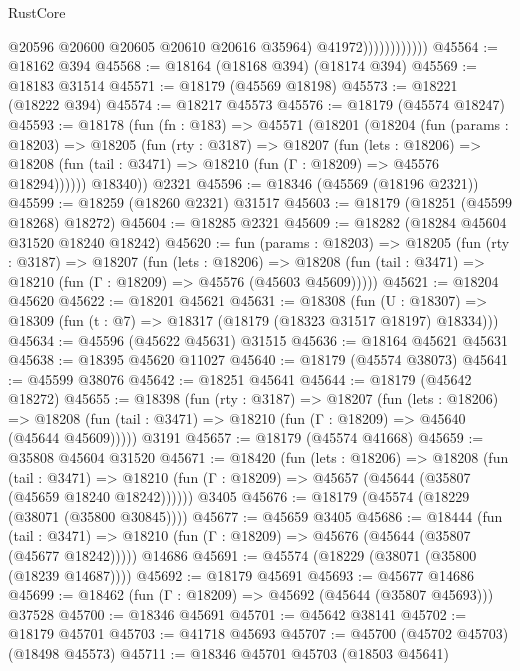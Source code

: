 \begin{lexlean}{RustCore}
\begin{coremodule}
                              @20596
                              @20600
                              @20605
                              @20610
                              @20616
                              @35964)
                            @41972))))))))))))
@45564 := @18162 @394
@45568 := @18164 (@18168 @394) (@18174 @394)
@45569 := @18183 @31514
@45571 := @18179 (@45569 @18198)
@45573 := @18221 (@18222 @394)
@45574 := @18217 @45573
@45576 := @18179 (@45574 @18247)
@45593 := @18178
    (fun (fn : @183) =>
    @45571
      (@18201
        (@18204
          (fun (params : @18203) =>
          @18205
            (fun (rty : @3187) =>
            @18207
              (fun (lets : @18206) =>
              @18208 (fun (tail : @3471) => @18210 (fun (Γ : @18209) => @45576 @18294))))))
        @18340))
    @2321
@45596 := @18346 (@45569 (@18196 @2321))
@45599 := @18259 (@18260 @2321) @31517
@45603 := @18179 (@18251 (@45599 @18268) @18272)
@45604 := @18285 @2321
@45609 := @18282 (@18284 @45604 @31520 @18240 @18242)
@45620 := fun (params : @18203) =>
  @18205
    (fun (rty : @3187) =>
    @18207
      (fun (lets : @18206) =>
      @18208 (fun (tail : @3471) => @18210 (fun (Γ : @18209) => @45576 (@45603 @45609)))))
@45621 := @18204 @45620
@45622 := @18201 @45621
@45631 := @18308
    (fun (U : @18307) => @18309 (fun (t : @7) => @18317 (@18179 (@18323 @31517 @18197) @18334)))
@45634 := @45596 (@45622 @45631) @31515
@45636 := @18164 @45621 @45631
@45638 := @18395 @45620 @11027
@45640 := @18179 (@45574 @38073)
@45641 := @45599 @38076
@45642 := @18251 @45641
@45644 := @18179 (@45642 @18272)
@45655 := @18398
    (fun (rty : @3187) =>
    @18207
      (fun (lets : @18206) =>
      @18208 (fun (tail : @3471) => @18210 (fun (Γ : @18209) => @45640 (@45644 @45609)))))
    @3191
@45657 := @18179 (@45574 @41668)
@45659 := @35808 @45604 @31520
@45671 := @18420
    (fun (lets : @18206) =>
    @18208
      (fun (tail : @3471) =>
      @18210 (fun (Γ : @18209) => @45657 (@45644 (@35807 (@45659 @18240 @18242))))))
    @3405
@45676 := @18179 (@45574 (@18229 (@38071 (@35800 @30845))))
@45677 := @45659 @3405
@45686 := @18444
    (fun (tail : @3471) => @18210 (fun (Γ : @18209) => @45676 (@45644 (@35807 (@45677 @18242)))))
    @14686
@45691 := @45574 (@18229 (@38071 (@35800 (@18239 @14687))))
@45692 := @18179 @45691
@45693 := @45677 @14686
@45699 := @18462 (fun (Γ : @18209) => @45692 (@45644 (@35807 @45693))) @37528
@45700 := @18346 @45691
@45701 := @45642 @38141
@45702 := @18179 @45701
@45703 := @41718 @45693
@45707 := @45700 (@45702 @45703) (@18498 @45573)
@45711 := @18346 @45701 @45703 (@18503 @45641)

\end{coremodule}
\end{lexlean}
